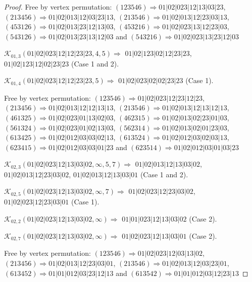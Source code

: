 \documentclass[12pt]{article}
\theoremstyle{plain}
\theoremstyle{definition}
\theoremstyle{remark}
\newcommand{\fancy}[1]{\mathcal{#1}}
\def\K{\fancy{K}}
\begin{document}
\begin{proof}
	Free by vertex permutation: $(1 2 3 5 4 6)\Rightarrow 01|02|023|12|13|03|23$, $(2 1 3 4 5 6)\Rightarrow 01|02|013|12|03|23|13$, $(2 1 3 5 4 6)\Rightarrow 01|02|013|12|23|03|13$, $(4 5 3 1 2 6)\Rightarrow 01|02|013|23|12|13|03$, $(4 5 3 2 1 6)\Rightarrow 01|02|023|13|12|23|03$, $(5 4 3 1 2 6)\Rightarrow 01|02|013|23|13|12|03$ and $(5 4 3 2 1 6)\Rightarrow 01|02|023|13|23|12|03$
	
	
	
	\bigskip
	
	$\K_{01,3}(01|02|023|12|12|23|23,4, 5)\Rightarrow $ $01|02|123|02|12|23|23$, $01|02|123|12|02|23|23$ (Case 1 and 2).
	
	$\K_{01,4}(01|02|023|12|12|23|23,5)\Rightarrow $ $01|02|023|02|02|23|23$ (Case 1).
	
	
	
	Free by vertex permutation: $(1 2 3 5 4 6)\Rightarrow 01|02|023|12|23|12|23$, $(2 1 3 4 5 6)\Rightarrow 01|02|013|12|12|13|13$, $(2 1 3 5 4 6)\Rightarrow 01|02|013|12|13|12|13$, $(4 6 1 3 2 5)\Rightarrow 01|02|023|01|13|02|03$, $(4 6 2 3 1 5)\Rightarrow 01|02|013|02|23|01|03$, $(5 6 1 3 2 4)\Rightarrow 01|02|023|01|02|13|03$, $(5 6 2 3 1 4)\Rightarrow 01|02|013|02|01|23|03$, $(6 1 3 4 2 5)\Rightarrow 01|02|012|03|03|02|13$, $(6 1 3 5 2 4)\Rightarrow 01|02|012|03|02|03|13$, $(6 2 3 4 1 5)\Rightarrow 01|02|012|03|03|01|23$ and $(6 2 3 5 1 4)\Rightarrow 01|02|012|03|01|03|23$
	
	
	
	\bigskip
	
	$\K_{02,3}(01|02|023|12|13|03|02,\infty,5, 7)\Rightarrow $ $01|02|013|12|13|03|02$, $01|02|013|12|23|03|02$, $01|02|013|12|13|03|01$ (Case 1 and 2).
	
	$\K_{02,5}(01|02|023|12|13|03|02,\infty,7)\Rightarrow $ $01|02|023|12|23|03|02$, $01|02|023|12|23|03|01$ (Case 1).
	
	$\K_{02,2}(01|02|023|12|13|03|02,\infty)\Rightarrow $ $01|01|023|12|13|03|02$ (Case 2).
	
	$\K_{02,7}(01|02|023|12|13|03|02,\infty)\Rightarrow $ $01|02|023|12|13|03|01$ (Case 2).
	
	
	
	Free by vertex permutation: $(1 2 3 5 4 6)\Rightarrow 01|02|023|12|03|13|02$, $(2 1 3 4 5 6)\Rightarrow 01|02|013|12|23|03|01$, $(2 1 3 5 4 6)\Rightarrow 01|02|013|12|03|23|01$, $(6 1 3 4 5 2)\Rightarrow 01|01|012|03|23|12|13$ and $(6 1 3 5 4 2)\Rightarrow 01|01|012|03|12|23|13$
	
	
	
	\bigskip
	

\end{proof}
\end{document}
